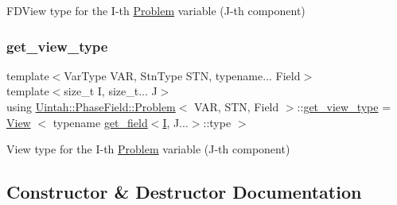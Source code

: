 F\+D\+View type for the I-\/th \hyperlink{classUintah_1_1PhaseField_1_1Problem}{Problem} variable (J-\/th component) 

\mbox{\label{classUintah_1_1PhaseField_1_1Problem_a53d941e785f501dddb8c369644eae4fa}} 
\subsubsection{\texorpdfstring{get\+\_\+view\+\_\+type}{get\_view\_type}}
{\footnotesize\ttfamily template$<$Var\+Type V\+AR, Stn\+Type S\+TN, typename... Field$>$ \\
template$<$size\+\_\+t I, size\+\_\+t... J$>$ \\
using \hyperlink{classUintah_1_1PhaseField_1_1Problem}{Uintah\+::\+Phase\+Field\+::\+Problem}$<$ V\+AR, S\+TN, Field $>$\+::\hyperlink{classUintah_1_1PhaseField_1_1Problem_a53d941e785f501dddb8c369644eae4fa}{get\+\_\+view\+\_\+type} =  \hyperlink{namespaceUintah_1_1PhaseField_a59210a1e28eba254d428762c92ddeabb}{View} $<$ typename \hyperlink{structUintah_1_1PhaseField_1_1Problem_1_1get__field}{get\+\_\+field}$<$\hyperlink{structUintah_1_1PhaseField_1_1I}{I}, J...$>$\+::type $>$}



View type for the I-\/th \hyperlink{classUintah_1_1PhaseField_1_1Problem}{Problem} variable (J-\/th component) 



\subsection{Constructor \& Destructor Documentation}
\mbox{\label{classUintah_1_1PhaseField_1_1Problem_af12ef510fb87d6c905f7a29d173f88ba}} 
